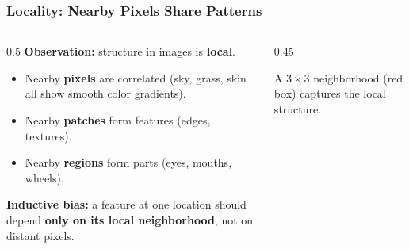 \documentclass[notes,11pt, aspectratio=169]{beamer}
\begin{document}
\begin{frame}
\frametitle{Locality: Nearby Pixels Share Patterns}

\begin{columns}[T]
\begin{column}{0.5\textwidth}
\textbf{Observation:} structure in images is \textbf{local}.

\vspace{6pt}
\begin{itemize}
    \item Nearby \textbf{pixels} are correlated (sky, grass, skin all show smooth color gradients).
    \item Nearby \textbf{patches} form features (edges, textures).
    \item Nearby \textbf{regions} form parts (eyes, mouths, wheels).
\end{itemize}

\vspace{8pt}
\textbf{Inductive bias:} a feature at one location should depend \textbf{only on its local neighborhood}, not on distant pixels.
\end{column}

\begin{column}{0.45\textwidth}
\begin{center}
\end{center}

{\small \centering A $3 \times 3$ neighborhood (red box) captures the local structure.}
\end{column}
\end{columns}
\end{frame}
\end{document}
